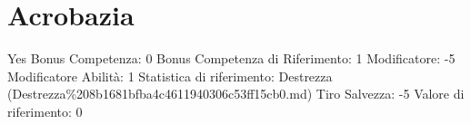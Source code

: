 \section{Acrobazia}\label{acrobazia}

\begin{description}
\tightlist
\item[Tags: ABI]
Yes Bonus Competenza: 0 Bonus Competenza di Riferimento: 1 Modificatore:
-5 Modificatore Abilità: 1 Statistica di riferimento: Destrezza
(Destrezza\%208b1681bfba4c4611940306c53ff15cb0.md) Tiro Salvezza: -5
Valore di riferimento: 0
\end{description}
